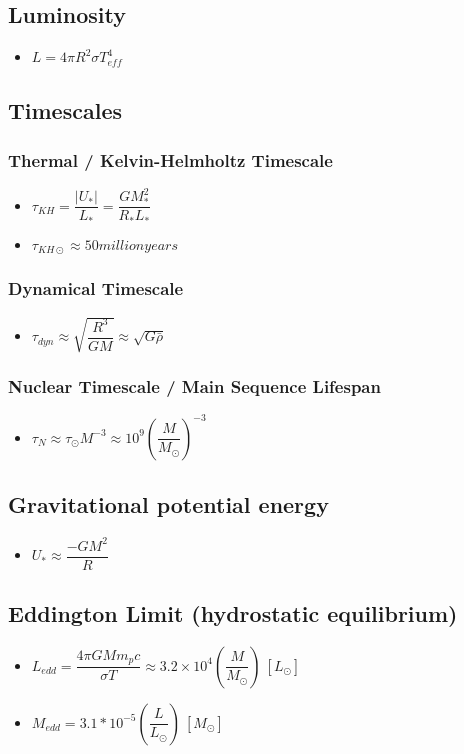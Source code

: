 \documentclass[]{report}
\newcommand \tab[1][1cm]{\hspace*{#1}}
\newcommand{\itemt}{\item \tab}
\begin{document}
	\subsection{Luminosity}
\begin{itemize}
\itemt \( L = 4\pi R^2 \sigma T_{eff}^4 \)
\end{itemize}
    
    \subsection{Timescales}

\subsubsection{Thermal / Kelvin-Helmholtz Timescale}
\begin{itemize}
\itemt \( \tau_{KH} = \dfrac{|U_*|}{L_*} = \dfrac{GM_*^2}{R_*L_*} \)
\itemt \( \tau_{KH\odot} \approx 50 million years \)
\end{itemize}

\subsubsection{Dynamical Timescale}
\begin{itemize}
\itemt \( \tau_{dyn} \approx \sqrt{\dfrac{R^3}{GM}} \approx \sqrt{G\bar{\rho}} \)
\end{itemize}

\subsubsection{Nuclear Timescale / Main Sequence Lifespan}
\begin{itemize}
\itemt \( \tau_N \approx \tau_{\odot}M^{-3} \approx 10^9 (\dfrac{M}{M_{\odot}})^{-3} \)
\end{itemize}


		\subsection{Gravitational potential energy}
\begin{itemize}
\itemt \( U_* \approx \dfrac{-GM^2}{R} \)
\end{itemize}

		\subsection{Eddington Limit (hydrostatic equilibrium)}
\begin{itemize}
\itemt \( L_{edd} = \dfrac{4\pi G M m_p c}{\sigma T} \approx 3.2 \times 10^4 (\dfrac{M}{M_\odot})\ [L_\odot] \)
\itemt \( M_{edd} = 3.1*10^{-5} (\dfrac{L}{L_\odot})\ [M_\odot] \)
\end{itemize}
\end{document}
